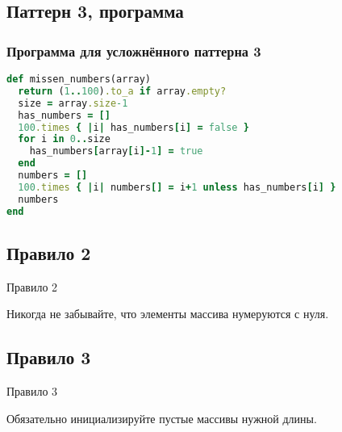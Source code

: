 \documentclass[compress,red]{beamer}
\begin{document}
\subsection{Паттерн 3, программа}
\begin{frame}[fragile]
\frametitle{Программа для усложнённого паттерна 3}
		\scriptsize{
	  \begin{lstlisting}[label=ruby6,language=Ruby,caption=Усложнённый паттерн 3]
def missen_numbers(array)
  return (1..100).to_a if array.empty?
  size = array.size-1
  has_numbers = []
  100.times { |i| has_numbers[i] = false }
  for i in 0..size
    has_numbers[array[i]-1] = true
  end
  numbers = []
  100.times { |i| numbers[] = i+1 unless has_numbers[i] }
  numbers
end
	  \end{lstlisting}
		}
\end{frame}

\subsection{Правило 2}
\begin{frame}
	\begin{center}
		\Huge{Правило 2}
	\end{center}
	\begin{center}
		\Large{Никогда не забывайте, что элементы массива нумеруются с нуля. }
	\end{center}
\end{frame}

\subsection{Правило 3}
\begin{frame}
	\begin{center}
		\Huge{Правило 3}
	\end{center}
	\begin{center}
		\Large{Обязательно инициализируйте пустые массивы нужной длины.}
	\end{center}
\end{frame}
\end{document}
